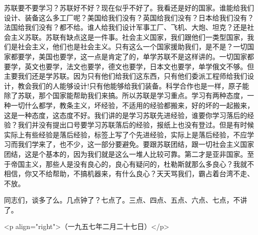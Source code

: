 苏联要不要学习？苏联好不好？现在似乎不好了。我看还是好的国家。谁能给我们设计、装备这么多工厂呢？美国给我们没有？英国给我们没有？日本给我们没有？法国给我们没有？都不给。谁人给我们设计军事工厂、飞机、大炮、坦克？还是社会主义苏联。苏联有缺点这是一件事。社会主义国家，我们跟他们一类型国家，我们是社会主义，他们也是社会主义。只有这么一个国家援助我们，是不是？一切国家都要学，美国也要学，这一点是肯定了的，单学苏联不是这样讲的。一切国家都要学，英文也要学，法文也要学，德文也要学，日本文也要学，单学俄文不够。但主要我们还是学苏联。因为只有他们给我们这东西，只有他们委派工程师给我们设计，教会我们的人能够设计!只有他能够给我们装备。科学合作也是一样，原子能除了苏联，那个国家能帮助我们来搞。所以苏联是学习重点。学习有两种态度，一种一切什么都学，教条主义，坏经验，不适用的经验都搬来，好的坏的一起搬来，这是一种态度，这态度不好。我们讲的是学习苏联先进经验，谁要你学习落后的经验？我们并没有提出口号要学习苏联落后的经验，报纸上也没有登过。但是有时候实际上有些经验是落后经验，标签上写了个先进经验，实际上是落后经验，不应学习而我们学来了，也不少，这一部分要避免。要跟苏联团结，跟一切社会主义国家团结，这是个基本的，因为我们就是这么一堆人比较可靠。第二才是亚非国家。至于帝国主义，那些人是没有良心的，良心有疑问的，杜勒斯就那么多良心？我就不相信，你又不给帮助，不搞机器来，有什么良心？天天骂我们，霸占着台湾不走、不放。

同志们，谈多了么。几点钟了？七点了。三点、四点、五点、六点、七点，不讲了。

<p align="right">（一九五七年二月二十七日）</p>


